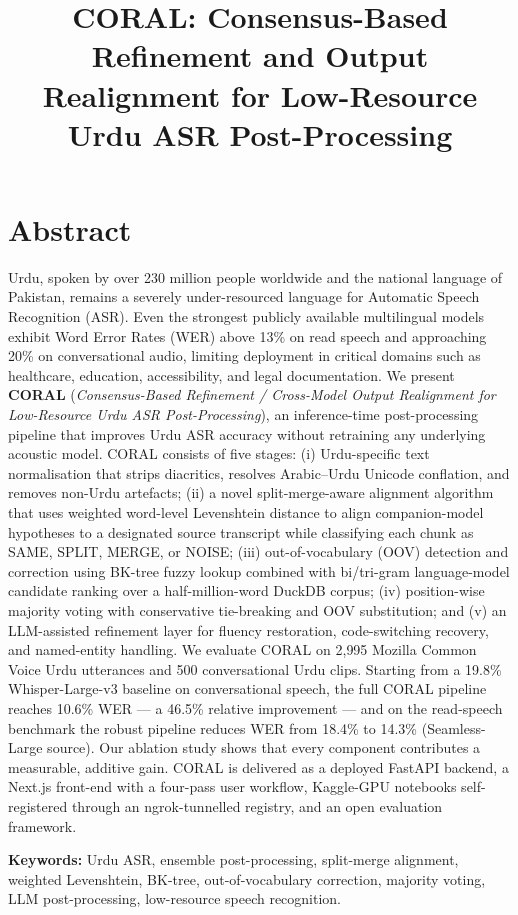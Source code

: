 \documentclass[openany]{fast-nuces-bs}
\title{CORAL: Consensus-Based Refinement and Output Realignment for Low-Resource Urdu ASR Post-Processing}
\newenvironment{abstract}
  {\chapter*{Abstract}\addcontentsline{toc}{chapter}{Abstract}\thispagestyle{plain}}
  {\par}
\begin{document}
\begin{abstract}
Urdu, spoken by over 230 million people worldwide and the national language of Pakistan, remains a severely under-resourced language for Automatic Speech Recognition (ASR). Even the strongest publicly available multilingual models exhibit Word Error Rates (WER) above 13\% on read speech and approaching 20\% on conversational audio, limiting deployment in critical domains such as healthcare, education, accessibility, and legal documentation. We present \textbf{CORAL} (\emph{Consensus-Based Refinement / Cross-Model Output Realignment for Low-Resource Urdu ASR Post-Processing}), an inference-time post-processing pipeline that improves Urdu ASR accuracy without retraining any underlying acoustic model. CORAL consists of five stages: (i) Urdu-specific text normalisation that strips diacritics, resolves Arabic--Urdu Unicode conflation, and removes non-Urdu artefacts; (ii) a novel split-merge-aware alignment algorithm that uses weighted word-level Levenshtein distance to align companion-model hypotheses to a designated source transcript while classifying each chunk as SAME, SPLIT, MERGE, or NOISE; (iii) out-of-vocabulary (OOV) detection and correction using BK-tree fuzzy lookup combined with bi/tri-gram language-model candidate ranking over a half-million-word DuckDB corpus; (iv) position-wise majority voting with conservative tie-breaking and OOV substitution; and (v) an LLM-assisted refinement layer for fluency restoration, code-switching recovery, and named-entity handling. We evaluate CORAL on 2{,}995 Mozilla Common Voice Urdu utterances and 500 conversational Urdu clips. Starting from a 19.8\% Whisper-Large-v3 baseline on conversational speech, the full CORAL pipeline reaches 10.6\% WER --- a 46.5\% relative improvement --- and on the read-speech benchmark the robust pipeline reduces WER from 18.4\% to 14.3\% (Seamless-Large source). Our ablation study shows that every component contributes a measurable, additive gain. CORAL is delivered as a deployed FastAPI backend, a Next.js front-end with a four-pass user workflow, Kaggle-GPU notebooks self-registered through an ngrok-tunnelled registry, and an open evaluation framework.

\textbf{Keywords:} Urdu ASR, ensemble post-processing, split-merge alignment, weighted Levenshtein, BK-tree, out-of-vocabulary correction, majority voting, LLM post-processing, low-resource speech recognition.
\end{abstract}
\end{document}
